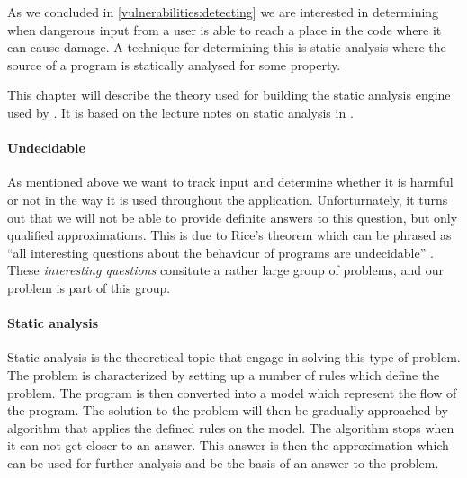 As we concluded in \cref{vulnerabilities:detecting}  we are interested in determining when dangerous input from a user is able to reach a place in the code where it can cause damage.
A technique for determining this is static analysis where the source of a program is statically analysed for some property.

This chapter will describe the theory used for building the static analysis engine used by \pyt{}.
It is based on the lecture notes on static analysis in \citet{schwartzbach}.

\paragraph{Undecidable}\label{theory_intro}
As mentioned above we want to track input and determine whether it is harmful or not in the way it is used throughout the application.
Unforturnately, it turns out that we will not be able to provide definite answers to this question, but only qualified approximations.
This is due to Rice's theorem which can be phrased as ``all interesting questions about the behaviour of programs are undecidable'' \citep[p.~3]{schwartzbach}.
These \emph{interesting questions} consitute a rather large group of problems, and our problem is part of this group.

\paragraph{Static analysis}
Static analysis is the theoretical topic that engage in solving this type of problem.
The problem is characterized by setting up a number of rules which define the problem.
The program is then converted into a model which represent the flow of the program.
The solution to the problem will then be gradually approached by algorithm that applies the defined rules on the model.
The algorithm stops when it can not get closer to an answer.
This answer is then the approximation which can be used for further analysis and be the basis of an answer to the problem.

